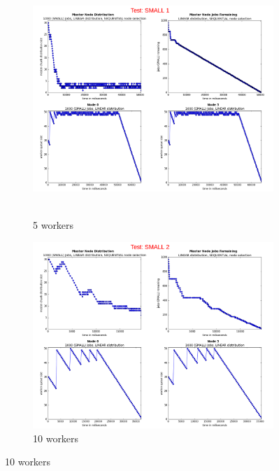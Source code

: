 \documentclass{article}
\begin{document}


\begin{figure}[p] 
  \begin{subfigure}[b]{0.5\linewidth}
    \centering
    \hbox{\hspace{-5.0em} \includegraphics[width=1.2\linewidth]{combined_small_growing_workers_linear/case_small_1} }
    \caption{5 workers}
    \label{testLinearSmall5} 
    \vspace{4ex}
  \end{subfigure}%
  \begin{subfigure}[b]{0.5\linewidth}
    \centering
    \includegraphics[width=1.2\linewidth]{combined_small_growing_workers_linear/case_small_2} 
    \caption{10 workers} 
    \label{testLinearSmall10} 
    \vspace{4ex}
  \end{subfigure} 
  

\end{figure}
\end{document}

